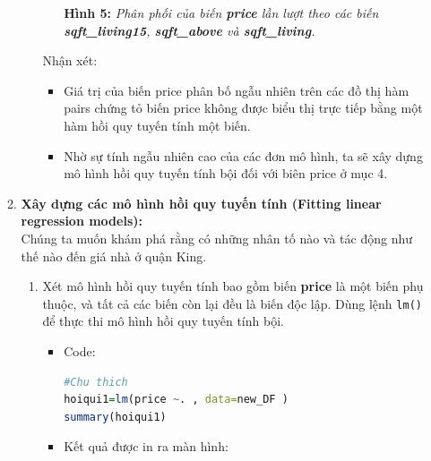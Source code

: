 \documentclass[a4paper]{article}
\theoremstyle{definition}
\begin{document}
\begin{itemize}
\begin{enumerate}
\begin{enumerate}
\begin{itemize}
            \begin{center}
                \textbf{Hình 5: }\textit{Phân phối của biến \textbf{price} lần lượt theo các biến \textbf{sqft\_living15}, \textbf{sqft\_above} và \textbf{sqft\_living}.}
            \end{center}
            
        \end{itemize}
    Nhận xét:\\
    \begin{itemize}
        \item Giá trị của biến price phân bố ngẫu nhiên trên các đồ thị hàm pairs chứng tỏ biến price không được biểu thị trực tiếp bằng một hàm hồi quy tuyến tính một biến.
        \item Nhờ sự tính ngẫu nhiên cao của các đơn mô hình, ta sẽ xây dựng mô hình hồi quy tuyến tính bội đối với biên price ở mục 4.
    \end{itemize}
            
    \end{enumerate}
    \item \textbf{Xây dựng các mô hình hồi quy tuyến tính (Fitting linear regression models):} \\
    \noindent Chúng ta muốn khám phá rằng có những nhân tố nào và tác động như thế nào đến giá nhà ở quận King.
    \begin{enumerate}
        \item Xét mô hình hồi quy tuyến tính bao gồm biến \textbf{price} là một biến phụ thuộc, và tất cả các biến còn lại đều là biến độc lập. Dùng lệnh \texttt{lm()} để thực thi mô hình hồi quy tuyến tính bội.
        
        \begin{itemize}
            \item Code:
            
            \begin{lstlisting}[language=R, caption=Code for question 4a]
#Chu thich        
hoiqui1=lm(price ~. , data=new_DF )
summary(hoiqui1)                
            \end{lstlisting}
            
            \item Kết quả được in ra màn hình:
            

\end{itemize}
\end{enumerate}
\end{enumerate}
\end{itemize}
\end{document}
